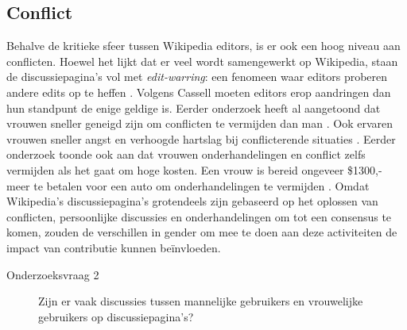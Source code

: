 \subsection{Conflict}
Behalve de kritieke sfeer tussen Wikipedia editors, is er ook een hoog niveau aan conflicten. Hoewel het lijkt dat er veel wordt samengewerkt op Wikipedia, staan de discussiepagina's vol met \textit{edit-warring}: een fenomeen waar editors proberen andere edits op te heffen \citep{cassell2011editwars}. Volgens Cassell moeten editors erop aandringen dan hun standpunt de enige geldige is. Eerder onderzoek heeft al aangetoond dat vrouwen sneller geneigd zijn om conflicten te vermijden dan man \citep{brewer2002gender}. Ook ervaren vrouwen sneller angst en verhoogde hartslag bij conflicterende situaties \citep{smith1998agency}. Eerder onderzoek toonde ook aan dat vrouwen onderhandelingen en conflict zelfs vermijden als het gaat om hoge kosten. Een vrouw is bereid ongeveer \$1300,- meer te betalen voor een auto om onderhandelingen te vermijden \citep{babcock2009women}. Omdat Wikipedia's discussiepagina's grotendeels zijn gebaseerd op het oplossen van conflicten, persoonlijke discussies en onderhandelingen om tot een consensus te komen, zouden de verschillen in gender om mee te doen aan deze activiteiten de impact van contributie kunnen be\"{i}nvloeden.
\begin{description}
\item[Onderzoeksvraag 2] Zijn er vaak discussies tussen mannelijke gebruikers en vrouwelijke gebruikers op discussiepagina's?
\end{description}

